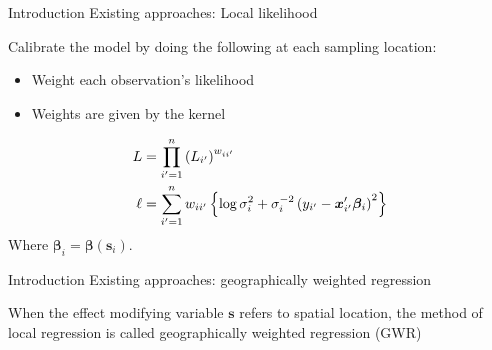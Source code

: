 \documentclass[12pt,t]{beamer}
\newcommand{\subt}[1]{{\footnotesize \color{subtitle} {#1}}}
\begin{document}
\begin{frame}{Introduction}
\subt{Existing approaches: Local likelihood}

\bigskip
Calibrate the model by doing the following at each sampling location:
\begin{itemize}
    \item Weight each observation's likelihood
    \item Weights are given by the kernel
\end{itemize}

\begin{align}
    L &= \prod_{i'=1}^n \left(L_{i'}\right)^{w_{ii'}} \notag \\
    \ell &= \sum_{i'=1}^n w_{ii'} \left\{\log \sigma_i^{2} + \sigma_i^{-2}\left(y_{i'} - \bm{x}_{i'}'\bm{\beta}_i\right)^2 \right\} \notag
\end{align}
Where $\bm{\beta}_i = \bm{\beta}(\bm{s}_i)$.

\end{frame}



\begin{frame}{Introduction}
\subt{Existing approaches: geographically weighted regression}

\bigskip
When the effect modifying variable $\bm{s}$ refers to spatial location, the method of local regression is called geographically weighted regression (GWR) \citep{Brundson:1998a, Fotheringham:2002}

\end{frame}
\end{document}

